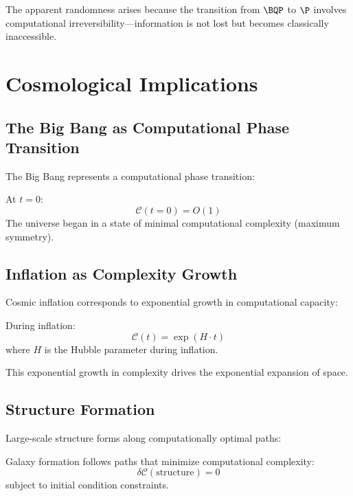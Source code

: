 \documentclass[12pt,a4paper]{article}
\newcommand{\comp}[1]{\mathcal{C}(#1)}
\begin{document}
The apparent randomness arises because the transition from $\BQP$ to $\P$ involves computational irreversibility—information is not lost but becomes classically inaccessible.

\section{Cosmological Implications}

\subsection{The Big Bang as Computational Phase Transition}

The Big Bang represents a computational phase transition:

\begin{theorem}
At $t = 0$:
\begin{equation}
\comp{t=0} = O(1)
\end{equation}
The universe began in a state of minimal computational complexity (maximum symmetry).
\end{theorem}

\subsection{Inflation as Complexity Growth}

Cosmic inflation corresponds to exponential growth in computational capacity:

\begin{proposition}
During inflation:
\begin{equation}
\comp{t} = \exp(H \cdot t)
\end{equation}
where $H$ is the Hubble parameter during inflation.
\end{proposition}

This exponential growth in complexity drives the exponential expansion of space.

\subsection{Structure Formation}

Large-scale structure forms along computationally optimal paths:

\begin{theorem}
Galaxy formation follows paths that minimize computational complexity:
\begin{equation}
\delta\comp{\text{structure}} = 0
\end{equation}
subject to initial condition constraints.
\end{theorem}
\end{document}
